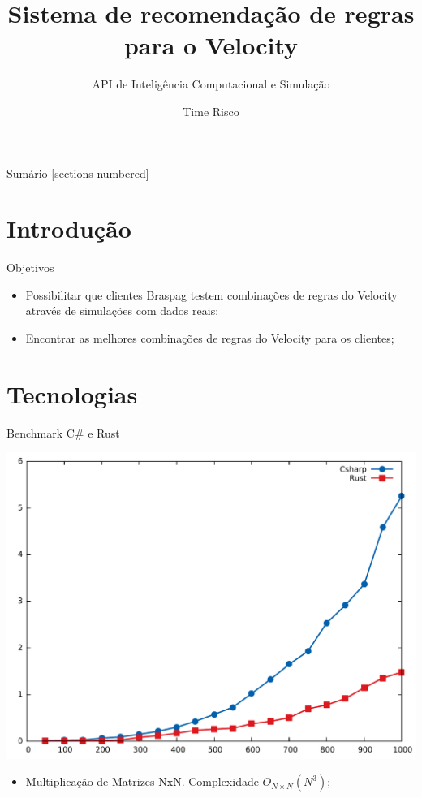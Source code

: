 \documentclass[10pt]{beamer}
\title{Sistema de recomendação de regras para o Velocity}
\subtitle{API de Inteligência Computacional e Simulação}
\date{}
\author{Time Risco}
\begin{document}
\maketitle

\begin{frame}{Sumário}
  [sections numbered]
  \tableofcontents[hideallsubsections]
\end{frame}

\section{Introdução}

\begin{frame}[fragile]{Objetivos}
	\begin{itemize}
		\item Possibilitar que clientes Braspag testem combinações de regras do Velocity através de simulações com dados reais;
		\item Encontrar as melhores combinações de regras do Velocity para os clientes;
	\end{itemize}
\end{frame}

\section{Tecnologias}

\begin{frame}[fragile]{Benchmark C\# e Rust}
	\begin{center}
		\includegraphics[scale=0.38]{imgs/graph.pdf}
	\end{center}
	\begin{itemize}
		\item Multiplicação de Matrizes NxN. Complexidade \textcolor{bluevs}{$O_{N \times N}(N^3)$};
	\end{itemize}
\end{frame}
\end{document}
